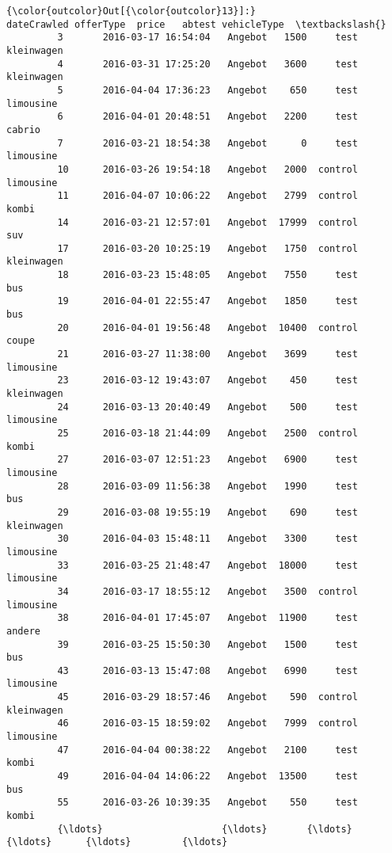 \documentclass[11pt]{article}
\begin{document}
\begin{Verbatim}[commandchars=\\\{\}]
{\color{outcolor}Out[{\color{outcolor}13}]:}                 dateCrawled offerType  price   abtest vehicleType  \textbackslash{}
         3       2016-03-17 16:54:04   Angebot   1500     test  kleinwagen   
         4       2016-03-31 17:25:20   Angebot   3600     test  kleinwagen   
         5       2016-04-04 17:36:23   Angebot    650     test   limousine   
         6       2016-04-01 20:48:51   Angebot   2200     test      cabrio   
         7       2016-03-21 18:54:38   Angebot      0     test   limousine   
         10      2016-03-26 19:54:18   Angebot   2000  control   limousine   
         11      2016-04-07 10:06:22   Angebot   2799  control       kombi   
         14      2016-03-21 12:57:01   Angebot  17999  control         suv   
         17      2016-03-20 10:25:19   Angebot   1750  control  kleinwagen   
         18      2016-03-23 15:48:05   Angebot   7550     test         bus   
         19      2016-04-01 22:55:47   Angebot   1850     test         bus   
         20      2016-04-01 19:56:48   Angebot  10400  control       coupe   
         21      2016-03-27 11:38:00   Angebot   3699     test   limousine   
         23      2016-03-12 19:43:07   Angebot    450     test  kleinwagen   
         24      2016-03-13 20:40:49   Angebot    500     test   limousine   
         25      2016-03-18 21:44:09   Angebot   2500  control       kombi   
         27      2016-03-07 12:51:23   Angebot   6900     test   limousine   
         28      2016-03-09 11:56:38   Angebot   1990     test         bus   
         29      2016-03-08 19:55:19   Angebot    690     test  kleinwagen   
         30      2016-04-03 15:48:11   Angebot   3300     test   limousine   
         33      2016-03-25 21:48:47   Angebot  18000     test   limousine   
         34      2016-03-17 18:55:12   Angebot   3500  control   limousine   
         38      2016-04-01 17:45:07   Angebot  11900     test      andere   
         39      2016-03-25 15:50:30   Angebot   1500     test         bus   
         43      2016-03-13 15:47:08   Angebot   6990     test   limousine   
         45      2016-03-29 18:57:46   Angebot    590  control  kleinwagen   
         46      2016-03-15 18:59:02   Angebot   7999  control   limousine   
         47      2016-04-04 00:38:22   Angebot   2100     test       kombi   
         49      2016-04-04 14:06:22   Angebot  13500     test         bus   
         55      2016-03-26 10:39:35   Angebot    550     test       kombi   
         {\ldots}                     {\ldots}       {\ldots}    {\ldots}      {\ldots}         {\ldots}   

\end{Verbatim}
\end{document}
